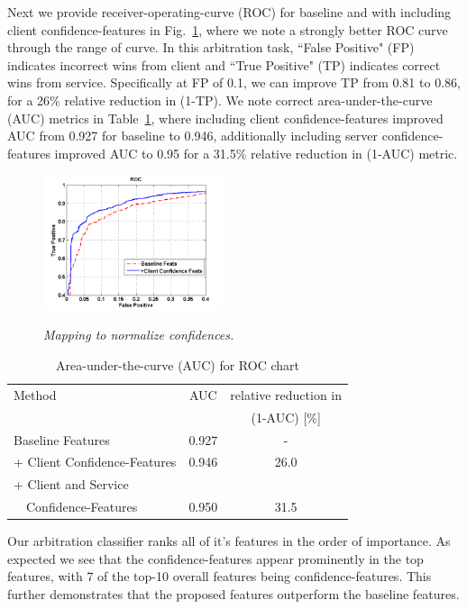 Next we provide receiver-operating-curve (ROC) for baseline and with including client confidence-features in Fig.~\ref{Fig:Baseline-ClientPred-ROC}, where we note a strongly better ROC curve through the range of curve. In this arbitration task, ``False Positive" (FP) indicates incorrect wins from client and ``True Positive" (TP) indicates correct wins from service. Specifically at FP of 0.1, we can improve TP from 0.81 to 0.86, for a 26\% relative reduction in (1-TP). We note correct area-under-the-curve (AUC) metrics in Table~\ref{tab:AUC_ROC}, where including client confidence-features improved AUC from 0.927 for baseline to 0.946, additionally including server confidence-features improved AUC to 0.95 for a 31.5\% relative reduction in (1-AUC) metric.

\begin{figure}[h]
\centering
{\includegraphics[width=0.47\textwidth]{Baseline-ClientPred-ROC}}
\caption{\it Mapping to normalize confidences.}
\label{Fig:Baseline-ClientPred-ROC}
\end{figure}

\begin{table}
\begin{center}
\begin{small}
\caption{Area-under-the-curve (AUC) for ROC chart} \label{tab:AUC_ROC}
\begin{tabular}{|l|c|c|}
\hline
Method & AUC & relative reduction in \\
& & (1-AUC) [\%]\\
\hline
Baseline Features & 0.927 & - \\
\hline
+ Client Confidence-Features & 0.946 & 26.0\\
\hline
+ Client and Service & &\\
~~Confidence-Features & 0.950 & 31.5\\
\hline
\end{tabular}
\end{small}
\end{center}
\end{table}

Our arbitration classifier ranks all of it's features in the order of importance. As expected we see that the confidence-features appear prominently in the top features, with 7 of the top-10 overall features being confidence-features. This further demonstrates that the proposed features outperform the baseline features.
